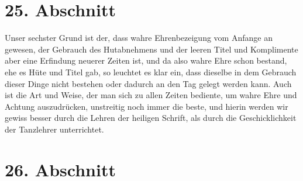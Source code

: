 \section{25. Abschnitt} \label{kap9_ab25}

Unser sechster Grund ist der, dass wahre Ehrenbezeigung vom Anfange an gewesen,
der Gebrauch des Hutabnehmens und der leeren Titel und Komplimente aber eine
Erfindung neuerer Zeiten ist, und da also wahre Ehre schon bestand, ehe es Hüte
und Titel gab, so leuchtet es klar ein, dass dieselbe in dem Gebrauch dieser
Dinge nicht bestehen oder dadurch an den Tag gelegt werden kann. Auch ist die
Art und Weise, der man sich zu allen Zeiten bediente, um wahre Ehre und Achtung
auszudrücken, unstreitig noch immer die beste, und hierin werden wir gewiss
besser durch die Lehren der heiligen Schrift, als durch die Geschicklichkeit der
Tanzlehrer unterrichtet.

\section{26. Abschnitt} \label{kap9_ab26}


